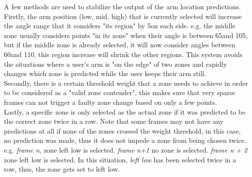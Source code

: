 A few methods are used to stabilize the output of the arm location predictions.\\
Firstly, the arm position (low, mid, high) that is currently selected will increase the angle range that it considers "its region" by 5\deg on each side. 
e.g. the middle zone usually considers points "in its zone" when their angle is between 65\deg and 105\deg, but if the middle zone is already selected, it will now consider angles between 60\deg and 110\deg, this region increase will shrink the other regions.
This system avoids the situations where a user's arm is "on the edge" of two zones and rapidly changes which zone is predicted while the user keeps their arm still.\\
Secondly, there is a certain threshold weight that a zone needs to achieve in order to be considered as a "valid zone contender", this makes sure that very sparse frames can not trigger a faulty zone change based on only a few points.\\
Lastly, a specific zone is only selected as the actual zone if it was predicted to be the correct zone twice in a row.
Note that some frames may not have any predictions at all if none of the zones crossed the weight threshold, in this case, no prediction was made, thus it does not impede a zone from being chosen twice.
e.g. \textit{frame n}, zone left low is selected. \textit{frame n+1} no zone is selected. \textit{frame n + 2} zone left low is selected.
In this situation, \textit{left low} has been selected twice in a row, thus, the zone gets set to left low.

